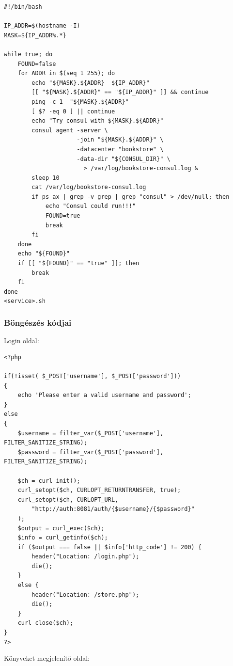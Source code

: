 \documentclass[11pt,magyar,a4paper,twoside,]{report}
\begin{document}
\begin{verbatim}
#!/bin/bash

IP_ADDR=$(hostname -I)
MASK=${IP_ADDR%.*}

while true; do
    FOUND=false
    for ADDR in $(seq 1 255); do
        echo "${MASK}.${ADDR}  ${IP_ADDR}"
        [[ "${MASK}.${ADDR}" == "${IP_ADDR}" ]] && continue
        ping -c 1  "${MASK}.${ADDR}"
        [ $? -eq 0 ] || continue
        echo "Try consul with ${MASK}.${ADDR}"
        consul agent -server \
                     -join "${MASK}.${ADDR}" \
                     -datacenter "bookstore" \
                     -data-dir "${CONSUL_DIR}" \
                       > /var/log/bookstore-consul.log &
        sleep 10
        cat /var/log/bookstore-consul.log
        if ps ax | grep -v grep | grep "consul" > /dev/null; then
            echo "Consul could run!!!"
            FOUND=true
            break
        fi
    done
    echo "${FOUND}"
    if [[ "${FOUND}" == "true" ]]; then
        break
    fi
done
<service>.sh
\end{verbatim}

\subsubsection{\texorpdfstring{Böngészés
kódjai\label{appendix-http}}{Böngészés kódjai}}\label{buxf6nguxe9szuxe9s-kuxf3djai}

Login oldal:

\begin{verbatim}
<?php

if(!isset( $_POST['username'], $_POST['password']))
{
    echo 'Please enter a valid username and password';
}
else
{
    $username = filter_var($_POST['username'], FILTER_SANITIZE_STRING);
    $password = filter_var($_POST['password'], FILTER_SANITIZE_STRING);

    $ch = curl_init();
    curl_setopt($ch, CURLOPT_RETURNTRANSFER, true);
    curl_setopt($ch, CURLOPT_URL,
        "http://auth:8081/auth/{$username}/{$password}"
    );
    $output = curl_exec($ch);
    $info = curl_getinfo($ch);
    if ($output === false || $info['http_code'] != 200) {
        header("Location: /login.php");
        die();
    }
    else {
        header("Location: /store.php");
        die();
    }
    curl_close($ch);
}
?>
\end{verbatim}

Könyveket megjelenítő oldal:
\end{document}
